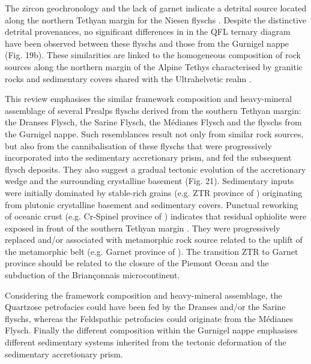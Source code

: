 \documentclass[twoside]{article}
\begin{document}
\medskip
The zircon geochronology \citep{Beltran-Trivino2013} and the lack of garnet \citep{Wildi1985,Bernoulli1990,Argnani2004} indicate a detrital source located along the northern Tethyan margin for the Niesen flyschs \citep{Wildi1985}. Despite the distinctive detrital provenances, no significant differences in in the QFL ternary diagram have been observed between these flyschs and those from the Gurnigel nappe (Fig. 19b). These similarities are linked to the homogeneous composition of rock sources along the northern margin of the Alpine Tethys characterised by granitic rocks and sedimentary covers shared with the Ultrahelvetic realm \citep{Ackermann1986,Lihou1996b}.\par
\medskip
This review emphasises the similar framework composition and heavy-mineral assemblage of several Prealps flyschs derived from the southern Tethyan margin: the Dranses Flysch, the Sarine Flysch, the Médianes Flysch and the flyschs from the Gurnigel nappe. Such resemblances result not only from similar rock sources, but also from the cannibalisation of these flyschs that were progressively incorporated into the sedimentary accretionary prism, and fed the subsequent flysch deposits. They also suggest a gradual tectonic evolution of the accretionary wedge and the surrounding crystalline basement (Fig. 21). Sedimentary inputs were initially dominated by stable-rich grains (e.g. ZTR province of \citealp{Wildi1985}) originating from plutonic crystalline basement and sedimentary covers. Punctual reworking of oceanic crust (e.g. Cr-Spinel province of \citealp{Wildi1985}) indicates that residual ophiolite were exposed in front of the southern Tethyan margin \citep{Gasinski1997}. They were progressively replaced and/or associated with metamorphic rock source related to the uplift of the metamorphic belt (e.g. Garnet province of \citealp{Wildi1985}). The transition ZTR to Garnet province should be related to the closure of the Piemont Ocean and the subduction of the Briançonnais microcontinent.\par
Considering the framework composition and heavy-mineral assemblage, the Quartzose petrofacies could have been fed by the Dranses and/or the Sarine flyschs, whereas the Feldspathic petrofacies could originate from the Médianes Flysch. Finally the different composition within the Gurnigel nappe emphasises different sedimentary systems inherited from the tectonic deformation of the sedimentary accretionary prism.

\end{document}
